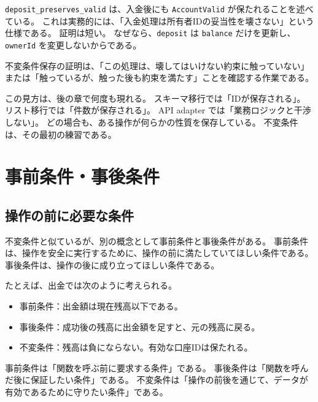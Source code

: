 \texttt{deposit\_preserves\_valid} は、入金後にも \texttt{AccountValid} が保たれることを述べている。
これは実務的には、「入金処理は所有者IDの妥当性を壊さない」という仕様である。
証明は短い。
なぜなら、\texttt{deposit} は \texttt{balance} だけを更新し、\texttt{ownerId} を変更しないからである。

\begin{intuitionbox}
不変条件保存の証明は、「この処理は、壊してはいけない約束に触っていない」または「触っているが、触った後も約束を満たす」ことを確認する作業である。
\end{intuitionbox}

この見方は、後の章で何度も現れる。
スキーマ移行では「IDが保存される」。
リスト移行では「件数が保存される」。
API adapter では「業務ロジックと干渉しない」。
どの場合も、ある操作が何らかの性質を保存している。
不変条件は、その最初の練習である。

\section{事前条件・事後条件}

\subsection{操作の前に必要な条件}

不変条件と似ているが、別の概念として事前条件と事後条件がある。
事前条件は、操作を安全に実行するために、操作の前に満たしていてほしい条件である。
事後条件は、操作の後に成り立ってほしい条件である。

たとえば、出金では次のように考えられる。

\begin{itemize}
\item 事前条件：出金額は現在残高以下である。
\item 事後条件：成功後の残高に出金額を足すと、元の残高に戻る。
\item 不変条件：残高は負にならない。有効な口座IDは保たれる。
\end{itemize}


\begin{definitionbox}
事前条件は「関数を呼ぶ前に要求する条件」である。
事後条件は「関数を呼んだ後に保証したい条件」である。
不変条件は「操作の前後を通じて、データが有効であるために守りたい条件」である。
\end{definitionbox}

